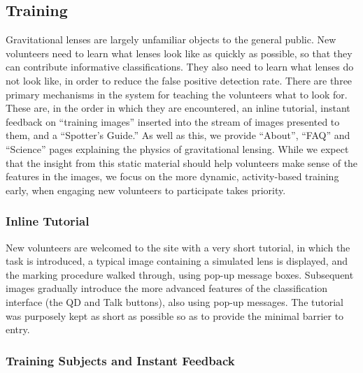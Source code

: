\documentclass[useAMS,usenatbib,a4paper]{mn2e}
\begin{document}
\subsection{Training}
\label{sec:design:training}

Gravitational lenses are largely unfamiliar objects to the general public.
New volunteers need to learn what lenses look like as quickly as possible, so
that they can contribute informative classifications. They also need to learn
what lenses do not look like, in order to reduce the false positive detection
rate. There are three primary mechanisms in the \sw system for teaching the
volunteers what to look for. These are, in the order in which they are
encountered, an inline tutorial, instant feedback on ``training images''
inserted into the stream of images presented to them, and a ``Spotter's
Guide.'' As well as this, we provide ``About'', ``FAQ'' and ``Science'' pages
explaining the physics of gravitational lensing. While we expect that the
insight from this static material should help volunteers make sense of the
features in the images, we focus on the more dynamic, activity-based training
early, when engaging new volunteers to participate takes priority.


\subsubsection{Inline Tutorial}

New volunteers are welcomed to the site with a very short tutorial, in which
the task is introduced, a typical image containing a simulated lens is
displayed, and the marking procedure walked through, using pop-up message
boxes. Subsequent images gradually introduce the more advanced features of the
classification interface (the QD and Talk buttons), also using pop-up
messages. The tutorial was purposely kept as short as possible so as to
provide the minimal barrier to entry.

\subsubsection{Training Subjects and Instant Feedback}
\end{document}
